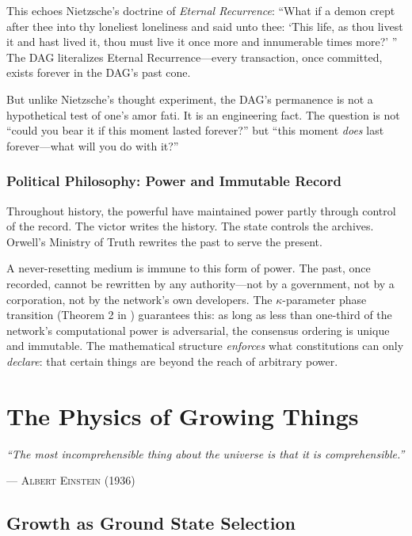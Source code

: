 \documentclass[12pt,a4paper]{article}
\theoremstyle{philosophical}
\begin{document}
This echoes Nietzsche's doctrine of \emph{Eternal Recurrence}: ``What if a demon crept after thee into thy loneliest loneliness and said unto thee: `This life, as thou livest it and hast lived it, thou must live it once more and innumerable times more?' '' The DAG literalizes Eternal Recurrence---every transaction, once committed, exists forever in the DAG's past cone.

But unlike Nietzsche's thought experiment, the DAG's permanence is not a hypothetical test of one's amor fati. It is an engineering fact. The question is not ``could you bear it if this moment lasted forever?'' but ``this moment \emph{does} last forever---what will you do with it?''

\subsubsection{Political Philosophy: Power and Immutable Record}

Throughout history, the powerful have maintained power partly through control of the record. The victor writes the history. The state controls the archives. Orwell's Ministry of Truth rewrites the past to serve the present.

A never-resetting medium is immune to this form of power. The past, once recorded, cannot be rewritten by any authority---not by a government, not by a corporation, not by the network's own developers. The $\kappa$-parameter phase transition (Theorem 2 in \cite{qnk-physics}) guarantees this: as long as less than one-third of the network's computational power is adversarial, the consensus ordering is unique and immutable. The mathematical structure \emph{enforces} what constitutions can only \emph{declare}: that certain things are beyond the reach of arbitrary power.

\section{The Physics of Growing Things}

\epigraph{\textit{``The most incomprehensible thing about the universe is that it is comprehensible.''}}{\textsc{--- Albert Einstein} (1936)}

\subsection{Growth as Ground State Selection}
\end{document}
